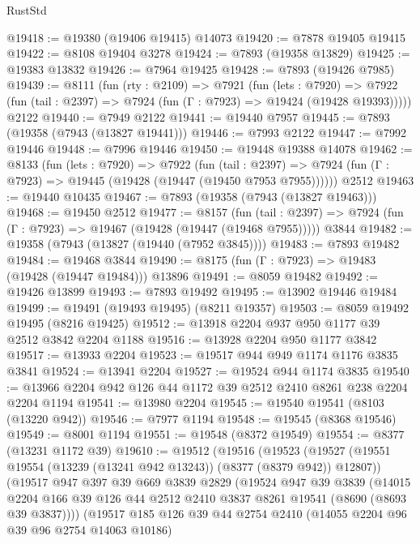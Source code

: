 \begin{lexlean}{RustStd}
\begin{coremodule}
@19418 := @19380 (@19406 @19415) @14073
@19420 := @7878 @19405 @19415
@19422 := @8108 @19404 @3278
@19424 := @7893 (@19358 @13829)
@19425 := @19383 @13832
@19426 := @7964 @19425
@19428 := @7893 (@19426 @7985)
@19439 := @8111
    (fun (rty : @2109) =>
    @7921
      (fun (lets : @7920) =>
      @7922 (fun (tail : @2397) => @7924 (fun (Γ : @7923) => @19424 (@19428 @19393)))))
    @2122
@19440 := @7949 @2122
@19441 := @19440 @7957
@19445 := @7893 (@19358 (@7943 (@13827 @19441)))
@19446 := @7993 @2122
@19447 := @7992 @19446
@19448 := @7996 @19446
@19450 := @19448 @19388 @14078
@19462 := @8133
    (fun (lets : @7920) =>
    @7922
      (fun (tail : @2397) =>
      @7924 (fun (Γ : @7923) => @19445 (@19428 (@19447 (@19450 @7953 @7955))))))
    @2512
@19463 := @19440 @10435
@19467 := @7893 (@19358 (@7943 (@13827 @19463)))
@19468 := @19450 @2512
@19477 := @8157
    (fun (tail : @2397) => @7924 (fun (Γ : @7923) => @19467 (@19428 (@19447 (@19468 @7955)))))
    @3844
@19482 := @19358 (@7943 (@13827 (@19440 (@7952 @3845))))
@19483 := @7893 @19482
@19484 := @19468 @3844
@19490 := @8175 (fun (Γ : @7923) => @19483 (@19428 (@19447 @19484))) @13896
@19491 := @8059 @19482
@19492 := @19426 @13899
@19493 := @7893 @19492
@19495 := @13902 @19446 @19484
@19499 := @19491 (@19493 @19495) (@8211 @19357)
@19503 := @8059 @19492 @19495 (@8216 @19425)
@19512 := @13918 @2204 @937 @950 @1177 @39 @2512 @3842 @2204 @1188
@19516 := @13928 @2204 @950 @1177 @3842
@19517 := @13933 @2204
@19523 := @19517 @944 @949 @1174 @1176 @3835 @3841
@19524 := @13941 @2204
@19527 := @19524 @944 @1174 @3835
@19540 := @13966 @2204 @942 @126 @44 @1172 @39 @2512 @2410 @8261 @238 @2204 @2204 @1194
@19541 := @13980 @2204
@19545 := @19540 @19541 (@8103 (@13220 @942))
@19546 := @7977 @1194
@19548 := @19545 (@8368 @19546)
@19549 := @8001 @1194
@19551 := @19548 (@8372 @19549)
@19554 := @8377 (@13231 @1172 @39)
@19610 := @19512
    (@19516
      (@19523
        (@19527 (@19551 @19554 (@13239 (@13241 @942 @13243)) (@8377 (@8379 @942)) @12807))
        (@19517
          @947
          @397
          @39
          @669
          @3839
          @2829
          (@19524
            @947
            @39
            @3839
            (@14015
              @2204
              @166
              @39
              @126
              @44
              @2512
              @2410
              @3837
              @8261
              @19541
              (@8690 (@8693 @39 @3837))))
          (@19517
            @185
            @126
            @39
            @44
            @2754
            @2410
            (@14055 @2204 @96 @39 @96 @2754 @14063 @10186)

\end{coremodule}
\end{lexlean}
